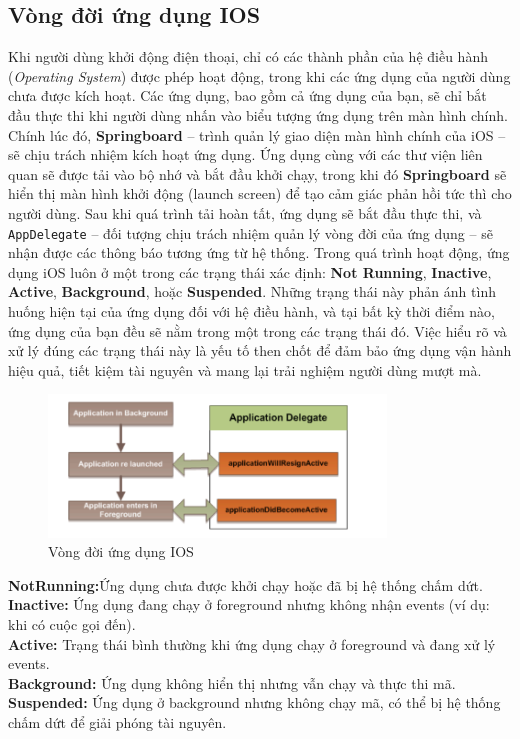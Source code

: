    \subsection{ Vòng đời ứng dụng IOS}	
        \begin{flushleft}
            Khi người dùng khởi động điện thoại, chỉ có các thành phần của hệ điều hành (\textit{Operating System}) được phép hoạt động, trong khi các ứng dụng của người dùng chưa được kích hoạt. Các ứng dụng, bao gồm cả ứng dụng của bạn, sẽ chỉ bắt đầu thực thi khi người dùng nhấn vào biểu tượng ứng dụng trên màn hình chính. Chính lúc đó, \textbf{Springboard} – trình quản lý giao diện màn hình chính của iOS – sẽ chịu trách nhiệm kích hoạt ứng dụng. Ứng dụng cùng với các thư viện liên quan sẽ được tải vào bộ nhớ và bắt đầu khởi chạy, trong khi đó \textbf{Springboard} sẽ hiển thị màn hình khởi động (launch screen) để tạo cảm giác phản hồi tức thì cho người dùng. Sau khi quá trình tải hoàn tất, ứng dụng sẽ bắt đầu thực thi, và \texttt{AppDelegate} – đối tượng chịu trách nhiệm quản lý vòng đời của ứng dụng 
            – sẽ nhận được các thông báo tương ứng từ hệ thống.
            Trong quá trình hoạt động, ứng dụng iOS luôn ở một trong các trạng thái xác định: \textbf{Not Running}, \textbf{Inactive}, \textbf{Active}, \textbf{Background}, hoặc \textbf{Suspended}. Những trạng thái này phản ánh tình huống hiện tại của ứng dụng đối với hệ điều hành, và tại bất kỳ thời điểm nào, ứng dụng của bạn đều sẽ nằm trong một trong các trạng thái đó. Việc hiểu rõ và xử lý đúng các trạng thái này là yếu tố then chốt để đảm bảo ứng dụng vận hành hiệu quả, tiết kiệm tài nguyên và mang lại trải nghiệm người dùng mượt mà.
            
        \end{flushleft}
        \begin{figure}[H] %
            \centering
            \includegraphics[width=0.8\textwidth]{images/vongdoiios.png}
             \caption{Vòng đời ứng dụng IOS}
            \label{fig:vongdoiios}
        \end{figure}
         \begin{flushleft}
            \textbf{NotRunning:}Ứng dụng chưa được khởi chạy hoặc đã bị hệ thống chấm dứt.
            \textbf{Inactive:} Ứng dụng đang chạy ở foreground nhưng không nhận events (ví dụ: khi có cuộc gọi đến).\\
            \textbf{Active:} Trạng thái bình thường khi ứng dụng chạy ở foreground và đang xử lý events.\\
            \textbf{Background:} Ứng dụng không hiển thị nhưng vẫn chạy và thực thi mã.\\
            \textbf{Suspended:} Ứng dụng ở background nhưng không chạy mã, có thể bị hệ thống chấm dứt để giải phóng tài nguyên.
         \end{flushleft}
